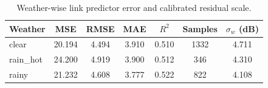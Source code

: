 \begin{table}[!t]
\centering
\caption{Weather-wise link predictor error and calibrated residual scale.}
\label{tab:predictor_weather}
\scriptsize
\begin{tabular}{lcccccc}
\toprule
Weather & MSE & RMSE & MAE & $R^2$ & Samples & $\sigma_w$ (dB) \\
\midrule
clear & 20.194 & 4.494 & 3.910 & 0.510 & 1332 & 4.711 \\
rain\_hot & 24.200 & 4.919 & 3.900 & 0.512 & 346 & 4.310 \\
rainy & 21.232 & 4.608 & 3.777 & 0.522 & 822 & 4.108 \\
\bottomrule
\end{tabular}
\end{table}
